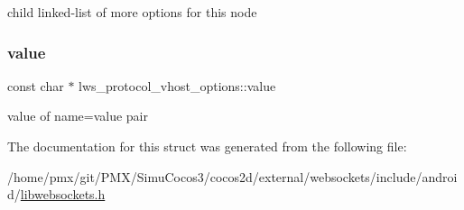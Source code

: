 child linked-\/list of more options for this node \mbox{\label{structlws__protocol__vhost__options_a6cd2a65b0689d306ef3ed019732439c0}} 
\subsubsection{\texorpdfstring{value}{value}}
{\footnotesize\ttfamily const char $\ast$ lws\+\_\+protocol\+\_\+vhost\+\_\+options\+::value}

value of name=value pair 

The documentation for this struct was generated from the following file\+:\begin{DoxyCompactItemize}
\item 
/home/pmx/git/\+P\+M\+X/\+Simu\+Cocos3/cocos2d/external/websockets/include/android/\hyperlink{_2cocos2d_2external_2websockets_2include_2android_2libwebsockets_8h}{libwebsockets.\+h}\end{DoxyCompactItemize}
